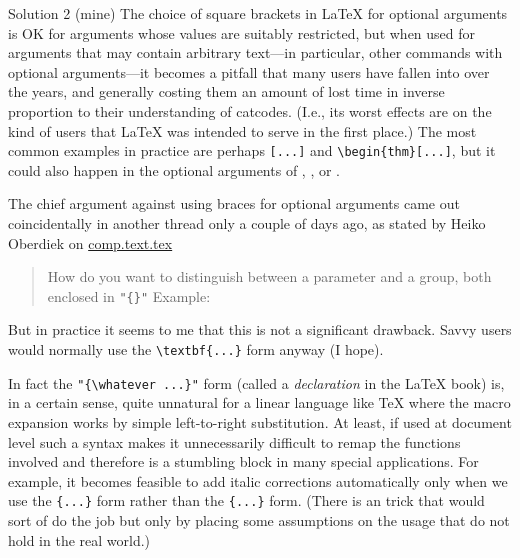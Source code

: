 \begin{solution}{Solution 2 (mine)}
The choice of square brackets in LaTeX for optional arguments is 
            OK for arguments whose values are suitably restricted, but when 
            used for arguments that may contain arbitrary text---in 
            particular, other commands with optional arguments---it becomes 
            a pitfall that many users have fallen into over the years, and 
            generally costing them an amount of lost time in inverse 
            proportion to their understanding of catcodes. (I.e., its worst 
            effects are on the kind of users that LaTeX was intended to 
            serve in the first place.) The most common examples in practice 
            are perhaps \cmd{\twocolumn}\verb?[...]? and \verb?\begin{thm}[...]?, but it could 
            also happen in the optional arguments of \cmd{\section}, \cmd{\caption}, or 
            \cmd{\cite}. 

The chief argument against using braces for optional arguments 
            came out coincidentally in another thread only a couple of days 
            ago, as stated by Heiko Oberdiek on \url{comp.text.tex} 
\begin{comment}
(&lt;am6mb5$a1<A 
            href="http://groups.google.com/groups/unlock?msg=b6e2e27a4e4413f7&amp;_done=/group/comp.text.tex/browse_thread/thread/cd0bd09362b1ac6c/b6e2e27a4e4413f7%
            target=_parent>...</A>@n.ruf.uni-freiburg.de&gt; comp.text.tex 17 
            Sep 2002): 
\end{comment}
\begin{quote}
How do you want to distinguish between a parameter and a 
group, both enclosed in \verb?"{}"? Example:
\begin{lcode}
\end{lcode}
\end{quote}

But in practice it seems to me that this is not a significant 
            drawback. Savvy users would normally use the \verb?\textbf{...}? form 
            anyway (I hope). 

In fact the \verb?"{\whatever ...}"? form (called a \emph{declaration} in the 
            LaTeX book) is, in a certain sense, quite unnatural for a linear 
            language like TeX where the macro expansion works by simple 
            left-to-right substitution. At least, if used at document level 
            such a syntax makes it unnecessarily difficult to remap the 
            functions involved and therefore is a stumbling block in many 
            special applications. For example, it becomes feasible to add 
            italic corrections automatically only when we use the \cmd{\emph}\verb?{...}? 
            form rather than the \verb?{?\cmd{\em}\verb?...}? form. (There is an 
\cmd{\aftergroup} 
            trick that would sort of do the job but only by placing some 
            assumptions on the usage that do not hold in the real world.) 
            


\end{solution}
